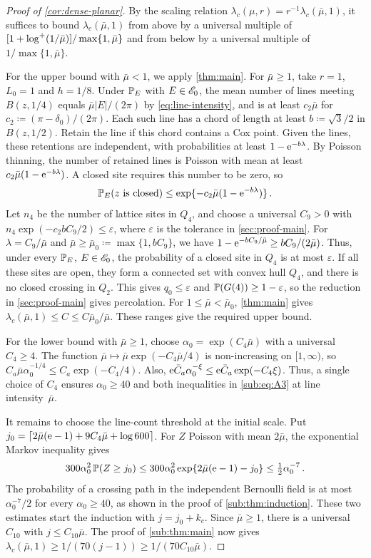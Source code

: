 \documentclass[11pt,letterpaper]{article}
\begin{document}
\begin{proof}[Proof of \cref{cor:dense-planar}]
By the scaling relation $\lambda_c(\mu,r)=r^{-1}\lambda_c(\bar\mu,1)$, it suffices to bound $\lambda_c(\bar\mu,1)$ from above by a universal multiple of $[1+\logp(1/\bar\mu)]/\max\{1,\bar\mu\}$ and from below by a universal multiple of $1/\max\{1,\bar\mu\}$.

For the upper bound with $\bar\mu<1$, we apply \cref{thm:main}. For $\bar\mu\ge1$, take $r=1$, $L_0=1$ and $h=1/8$. Under $\P_E$ with $E\in\cE_0$, the mean number of lines meeting $B(z,1/4)$ equals $\bar\mu\lvert E\rvert/(2\pi)$ by \eqref{eq:line-intensity}, and is at least $c_2\bar\mu$ for $c_2\coloneqq(\pi-\delta_0)/(2\pi)$. Each such line has a chord of length at least $b\coloneqq\sqrt3/2$ in $B(z,1/2)$. Retain the line if this chord contains a Cox point. Given the lines, these retentions are independent, with probabilities at least $1-\e^{-b\lambda}$. By Poisson thinning, the number of retained lines is Poisson with mean at least $c_2\bar\mu(1-\e^{-b\lambda})$. A closed site requires this number to be zero, so
\[
  \P_E(z\text{ is closed})\le \exp\{-c_2\bar\mu(1-\e^{-b\lambda})\}\,.
\]
Let $n_4$ be the number of lattice sites in $Q_4$, and choose a universal $C_9>0$ with $n_4\exp(-c_2bC_9/2)\le\varepsilon$, where $\varepsilon$ is the tolerance in \cref{sec:proof-main}. For $\lambda=C_9/\bar\mu$ and $\bar\mu\ge\bar\mu_0\coloneqq\max\{1,bC_9\}$, we have $1-\e^{-bC_9/\bar\mu}\ge bC_9/(2\bar\mu)$. Thus, under every $\P_E$, $E\in\cE_0$, the probability of a closed site in $Q_4$ is at most $\varepsilon$. If all these sites are open, they form a connected set with convex hull $Q_4$, and there is no closed crossing in $Q_2$. This gives $q_0\le\varepsilon$ and $\P(G(4))\ge1-\varepsilon$, so the reduction in \cref{sec:proof-main} gives percolation. For $1\le\bar\mu<\bar\mu_0$, \cref{thm:main} gives $\lambda_c(\bar\mu,1)\le C\le C\bar\mu_0/\bar\mu$. These ranges give the required upper bound.

For the lower bound with $\bar\mu\ge1$, choose $\alpha_0=\exp(C_4\bar\mu)$ with a universal $C_4\ge4$. The function $\bar\mu\mapsto\bar\mu\exp(-C_4\bar\mu/4)$ is non-increasing on $[1,\infty)$, so $C_a\bar\mu\alpha_0^{-1/4}\le C_a\exp(-C_4/4)$. Also, $\e\bar C_a\alpha_0^{-\xi}\le\e\bar C_a\exp(-C_4\xi)$. Thus, a single choice of $C_4$ ensures $\alpha_0\ge40$ and both inequalities in \eqref{sub:eq:A3} at line intensity~$\bar\mu$.

It remains to choose the line-count threshold at the initial scale. Put $j_0=\lceil 2\bar\mu(\e-1)+9C_4\bar\mu+\log 600\rceil$. For $Z$ Poisson with mean $2\bar\mu$, the exponential Markov inequality gives
\[
  300\alpha_0^2\,\P(Z\ge j_0)
  \le 300\alpha_0^2\exp\{2\bar\mu(\e-1)-j_0\}
  \le \tfrac12\alpha_0^{-7}\,.
\]
The probability of a crossing path in the independent Bernoulli field is at most $\alpha_0^{-7}/2$ for every $\alpha_0\ge40$, as shown in the proof of \cref{sub:thm:induction}. These two estimates start the induction with $j=j_0+k_c$. Since $\bar\mu\ge1$, there is a universal $C_{10}$ with $j\le C_{10}\bar\mu$. The proof of \cref{sub:thm:main} now gives $\lambda_c(\bar\mu,1)\ge1/(70(j-1))\ge1/(70C_{10}\bar\mu)$.


\end{proof}
\end{document}
